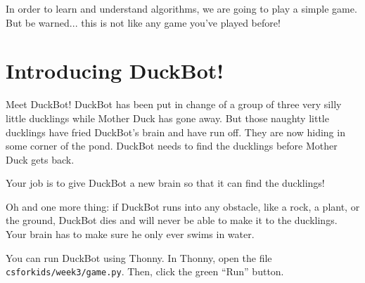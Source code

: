 In order to learn and understand algorithms, we are going to play a simple game. But be
warned... this is not like any game you've played before!

\section{Introducing DuckBot!}

Meet DuckBot! DuckBot has been put in change of a group of three very silly little ducklings while
Mother Duck has gone away. But those naughty little ducklings have fried DuckBot's brain and have run
off. They are now hiding in some corner of the pond. DuckBot needs to find the ducklings before
Mother Duck gets back.

Your job is to give DuckBot a new brain so that it can find the ducklings!

  Oh and one
more thing: if DuckBot runs into any obstacle, like a rock, a plant, or the ground, DuckBot dies and
will never be able to make it to the ducklings. Your brain has to make sure he only ever swims in
water.

You can run DuckBot using Thonny. In Thonny, open the file
\texttt{csforkids/week3/game.py}. Then, click the green ``Run''
button.

